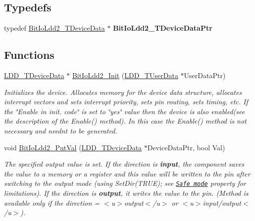 \subsection*{Typedefs}
\begin{DoxyCompactItemize}
\item 
\mbox{\label{group___bit_io_ldd2__module_ga58ccd058cbac67111c82dca4fa83692b}} 
typedef \hyperlink{struct_bit_io_ldd2___t_device_data}{Bit\+Io\+Ldd2\+\_\+\+T\+Device\+Data} $\ast$ {\bfseries Bit\+Io\+Ldd2\+\_\+\+T\+Device\+Data\+Ptr}
\end{DoxyCompactItemize}
\subsection*{Functions}
\begin{DoxyCompactItemize}
\item 
\hyperlink{group___p_e___types__module_gac5cf1362f1f0e3a2ce71b1bf2276d091}{L\+D\+D\+\_\+\+T\+Device\+Data} $\ast$ \hyperlink{group___bit_io_ldd2__module_ga553dbb392db7bc92230a019512a1e5ab}{Bit\+Io\+Ldd2\+\_\+\+Init} (\hyperlink{group___p_e___types__module_ga0b66a73f87238a782318aa0be7578e35}{L\+D\+D\+\_\+\+T\+User\+Data} $\ast$User\+Data\+Ptr)
\begin{DoxyCompactList}\small\item\em Initializes the device. Allocates memory for the device data structure, allocates interrupt vectors and sets interrupt priority, sets pin routing, sets timing, etc. If the \char`\"{}\+Enable
    in init. code\char`\"{} is set to \char`\"{}yes\char`\"{} value then the device is also enabled(see the description of the Enable() method). In this case the Enable() method is not necessary and needn\textquotesingle{}t to be generated. \end{DoxyCompactList}\item 
void \hyperlink{group___bit_io_ldd2__module_gaacea30e307e59fc9acf65e01892ad75b}{Bit\+Io\+Ldd2\+\_\+\+Put\+Val} (\hyperlink{group___p_e___types__module_gac5cf1362f1f0e3a2ce71b1bf2276d091}{L\+D\+D\+\_\+\+T\+Device\+Data} $\ast$Device\+Data\+Ptr, bool Val)
\begin{DoxyCompactList}\small\item\em The specified output value is set. If the direction is {\bfseries  input}, the component saves the value to a memory or a register and this value will be written to the pin after switching to the output mode (using {\ttfamily Set\+Dir(\+T\+R\+U\+E)}; see \href{BitIOProperties.html#SafeMode}{\tt Safe mode} property for limitations). If the direction is {\bfseries output}, it writes the value to the pin. (Method is available only if the direction = $<$u$>${\ttfamily output}$<$/u$>$ or $<$u$>${\ttfamily  input/output}$<$/u$>$). \end{DoxyCompactList}\end{DoxyCompactItemize}


